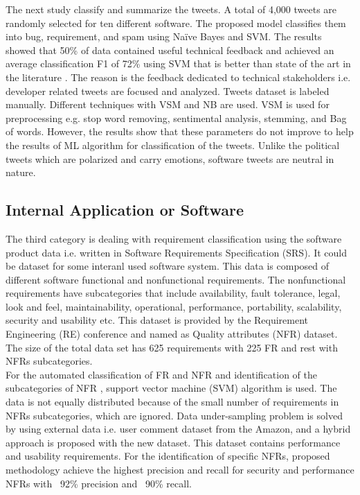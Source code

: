 	The next study \cite{williams2017} classify and summarize the tweets. A total of 
4,000 tweets are randomly selected for ten different software. The proposed model
classifies them into bug, requirement, and spam using Naïve Bayes and SVM. The results
showed that 50\% of data contained useful technical feedback and achieved an average
classification F1 of 72\% using SVM that is better than state of the art in the literature  \cite{guzman2017}. The
reason is the feedback dedicated to technical stakeholders i.e. developer related tweets are
focused and analyzed. Tweets dataset is labeled manually. Different techniques with VSM and
NB are used. VSM is used for preprocessing e.g. stop word removing, sentimental analysis, stemming,
and Bag of words. However, the results show that these parameters do not
improve to help the results of ML algorithm for classification of the tweets. Unlike the political
tweets which are polarized and carry emotions, software tweets are neutral in nature.\\

\subsection{Internal Application or Software}
The third category is dealing with requirement classification using the software product data
i.e. written in Software Requirements Specification (SRS). It could be dataset for some interanl used software system. This data is composed of different software functional and nonfunctional
requirements.  The nonfunctional requirements have subcategories that include availability,
fault tolerance, legal, look and feel, maintainability, operational, performance, portability,
scalability, security and usability etc. This dataset is provided by the Requirement Engineering
(RE) conference and named as Quality attributes (NFR) dataset. The size of the total data set
has 625 requirements with 225 FR and rest with NFRs subcategories. \\

	For the automated classification of FR and NFR and identification of the subcategories of NFR \cite{kurtanovic2017}, support
vector machine (SVM) algorithm is used. The data is not equally distributed because of the small
number of requirements in NFRs subcategories, which are ignored. Data
under-sampling problem is solved by using external data i.e. user comment
dataset from the Amazon, and a hybrid approach is proposed with the new dataset. This
dataset contains performance and usability requirements. For the identification of specific
NFRs, proposed methodology achieve the highest precision and recall for security and
performance NFRs with ~92\% precision and ~90\% recall. \\

